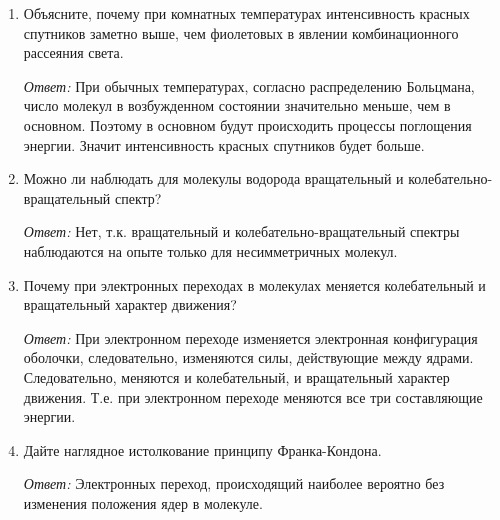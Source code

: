\begin{enumerate}
\vspace*{1.5em}
\item Объясните, почему при комнатных температурах интенсивность красных спутников
заметно выше, чем фиолетовых в явлении комбинационного рассеяния света.
        
\emph{Ответ:}
При обычных температурах, согласно распределению Больцмана, число молекул в
возбужденном состоянии значительно меньше, чем в основном. Поэтому в основном
будут происходить процессы поглощения энергии. Значит интенсивность красных
спутников будет больше.

\vspace*{1.5em}
\item Можно ли наблюдать для молекулы водорода вращательный и
колебательно-вращательный спектр?
        
\emph{Ответ:}
Нет, т.к. вращательный и колебательно-вращательный спектры наблюдаются на опыте
только для несимметричных молекул.

\vspace*{1.5em}
\item Почему при электронных переходах в молекулах меняется колебательный и
вращательный характер движения?

\emph{Ответ:} При электронном переходе изменяется электронная конфигурация
оболочки, следовательно, изменяются силы, действующие между ядрами.
Следовательно, меняются и колебательный, и вращательный характер движения. Т.е.
при электронном переходе меняются все три составляющие энергии.

\vspace*{1.5em}
\item Дайте наглядное истолкование принципу Франка-Кондона.

\emph{Ответ:}
Электронных переход, происходящий наиболее вероятно без изменения положения ядер
в молекуле.

\end{enumerate}
